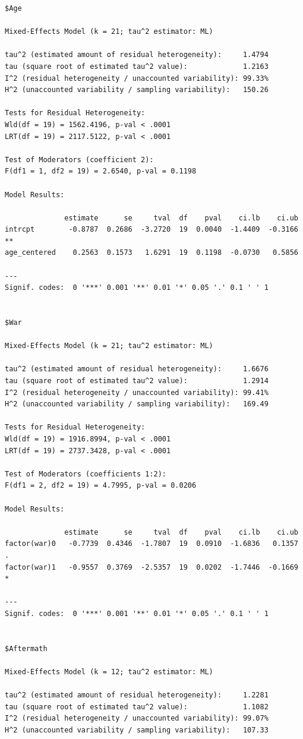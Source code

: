\documentclass[
  letterpaper,
  DIV=11,
  numbers=noendperiod]{scrartcl}
\begin{document}
\begin{verbatim}
$Age

Mixed-Effects Model (k = 21; tau^2 estimator: ML)

tau^2 (estimated amount of residual heterogeneity):     1.4794
tau (square root of estimated tau^2 value):             1.2163
I^2 (residual heterogeneity / unaccounted variability): 99.33%
H^2 (unaccounted variability / sampling variability):   150.26

Tests for Residual Heterogeneity:
Wld(df = 19) = 1562.4196, p-val < .0001
LRT(df = 19) = 2117.5122, p-val < .0001

Test of Moderators (coefficient 2):
F(df1 = 1, df2 = 19) = 2.6540, p-val = 0.1198

Model Results:

              estimate      se     tval  df    pval    ci.lb    ci.ub     
intrcpt        -0.8787  0.2686  -3.2720  19  0.0040  -1.4409  -0.3166  ** 
age_centered    0.2563  0.1573   1.6291  19  0.1198  -0.0730   0.5856     

---
Signif. codes:  0 '***' 0.001 '**' 0.01 '*' 0.05 '.' 0.1 ' ' 1


$War

Mixed-Effects Model (k = 21; tau^2 estimator: ML)

tau^2 (estimated amount of residual heterogeneity):     1.6676
tau (square root of estimated tau^2 value):             1.2914
I^2 (residual heterogeneity / unaccounted variability): 99.41%
H^2 (unaccounted variability / sampling variability):   169.49

Tests for Residual Heterogeneity:
Wld(df = 19) = 1916.8994, p-val < .0001
LRT(df = 19) = 2737.3428, p-val < .0001

Test of Moderators (coefficients 1:2):
F(df1 = 2, df2 = 19) = 4.7995, p-val = 0.0206

Model Results:

              estimate      se     tval  df    pval    ci.lb    ci.ub    
factor(war)0   -0.7739  0.4346  -1.7807  19  0.0910  -1.6836   0.1357  . 
factor(war)1   -0.9557  0.3769  -2.5357  19  0.0202  -1.7446  -0.1669  * 

---
Signif. codes:  0 '***' 0.001 '**' 0.01 '*' 0.05 '.' 0.1 ' ' 1


$Aftermath

Mixed-Effects Model (k = 12; tau^2 estimator: ML)

tau^2 (estimated amount of residual heterogeneity):     1.2281
tau (square root of estimated tau^2 value):             1.1082
I^2 (residual heterogeneity / unaccounted variability): 99.07%
H^2 (unaccounted variability / sampling variability):   107.33


\end{verbatim}
\end{document}
